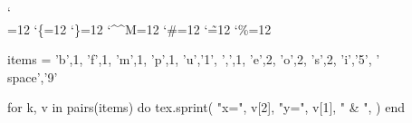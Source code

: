 \documentclass{article}
\def\luacode{%
  \bgroup
  \catcode`\\=12
  \catcode`\{=12
  \catcode`\}=12
  \catcode`\^^M=12
  \catcode`\#=12
  \catcode`\~=12
  \catcode`\%=12
  \doluacode
}
\begin{document}
\luacode
items = {
    {'b',1}, {'f',1}, {'m',1}, {'p',1}, {'u','1'},
    {',',1}, {'e',2}, {'o',2}, {'s',2}, {'i','5'},
    {'\\space','9'}
}

for k, v in pairs(items) do
    tex.sprint({
        "x=",
        v[2],
        "y=",
        v[1],
        " & ",
    })
end
\endluacode
\end{document}
